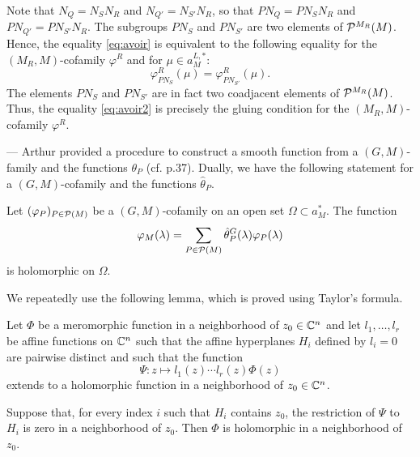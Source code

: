 \begin{paragr}
\begin{preuve}
Note that $N_Q=N_SN_R$ and $N_{Q'}=N_{S'}N_R$, so that $PN_Q=PN_S N_R$ and $PN_{Q'}=PN_{S'} N_R$. The subgroups $PN_S$ and $PN_{S'}$ are two elements of $\mathcal{P}^{M_R}(M)$. Hence, the equality \eqref{eq:avoir} is equivalent to the following equality for the $(M_R,M)$-cofamily $\varphi^R$ and for $\mu\in a_M^{L,*}$:
\begin{equation}
  \label{eq:avoir2}
  \varphi_{PN_S}^R(\mu)=\varphi_{PN_{S'}}^R(\mu).
\end{equation}
The elements $PN_S$ and $PN_{S'}$ are in fact two coadjacent elements of $\mathcal{P}^{M_R}(M)$. Thus, the equality \eqref{eq:avoir2} is precisely the gluing condition for the $(M_R,M)$-cofamily $\varphi^R$.
\end{preuve}
\end{paragr}

\begin{paragr} --- Arthur provided a procedure to construct a smooth function from a $(G,M)$-family and the functions $\theta_P$ (cf. \cite{trace_inv} p.37). Dually, we have the following statement for a $(G,M)$-cofamily and the functions $\hat{\theta}_P$.
  
\begin{lemme}\label{lem:fctlisse}
  Let $(\varphi_P)_{P\in \mathcal{P}(M)}$ be a $(G,M)$-cofamily on an open set $\Omega\subset a_M^*$.  The function 
$$\varphi_M(\lambda)=\sum_{P\in \mathcal{P}(M)} \hat{\theta}_P^G(\lambda) \varphi_P(\lambda)$$
is holomorphic on $\Omega$.
\end{lemme}

\begin{preuve}
We repeatedly use the following lemma, which is proved using Taylor's formula.

\begin{lemme}\label{lem:Taylor} Let $\Phi$ be a meromorphic function in a neighborhood of $z_0\in \mathbb{C}^n$ and let $l_1,\ldots,l_r$ be affine functions on $\mathbb{C}^n$ such that the affine hyperplanes $H_i$ defined by $l_i=0$ are pairwise distinct and such that the function
$$\Psi : z\mapsto l_1(z)\cdots l_r(z) \Phi(z)$$
extends to a holomorphic function in a neighborhood of $z_0\in \mathbb{C}^n$. 

Suppose that, for every index $i$ such that $H_i$ contains $z_0$, the restriction of $\Psi$ to $H_i$ is zero in a neighborhood of $z_0$. Then $\Phi$ is holomorphic in a neighborhood of $z_0$.
\end{lemme}


\end{preuve}
\end{paragr}
